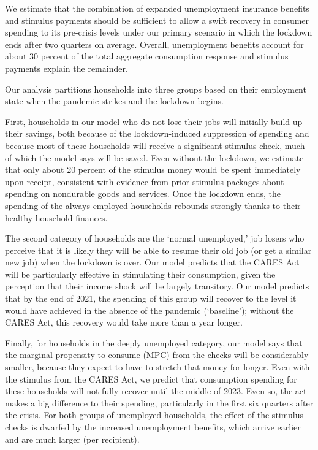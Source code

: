 \documentclass[titlepage]{\econtex}
\begin{document}
We estimate that the combination of expanded unemployment insurance benefits and stimulus payments should be sufficient to allow a swift recovery in consumer spending to its pre-crisis levels under our primary scenario in which the lockdown ends after two quarters on average. 
Overall, unemployment benefits account for about 30 percent of the total aggregate consumption response and stimulus payments explain the remainder.

Our analysis partitions households into three groups based on their employment state when the pandemic strikes and the lockdown begins.

First, households in our model who do not lose their jobs will initially build up their savings, both because of the lockdown-induced suppression of spending and because most of these households will receive a significant stimulus check, much of which the model says will be saved.
Even without the lockdown, we estimate that only about 20 percent of the stimulus money would be spent immediately upon receipt, consistent with evidence from prior stimulus packages about spending on nondurable goods and services.
Once the lockdown ends, the spending of the always-employed households rebounds strongly thanks to their healthy household finances.

The second category of households are the `normal unemployed,' job losers who perceive that it is likely they will be able to resume their old job (or get a similar new job) when the lockdown is over.
Our model predicts that the CARES Act will be particularly effective in stimulating their consumption, given the perception that their income shock will be largely transitory.  Our model predicts that by the end of 2021, the spending of this group will recover to the level it would have achieved in the absence of the pandemic (`baseline'); without the CARES Act, this recovery would take more than a year longer.

Finally, for households in the deeply unemployed category, our model says that the marginal propensity to consume (MPC) from the checks will be considerably smaller, because they expect to have to stretch that money for longer.
Even with the stimulus from the CARES Act, we predict that consumption spending for these households will not fully recover until the middle of 2023.
Even so, the act makes a big difference to their spending, particularly in the first six quarters after the crisis.
For both groups of unemployed households, the effect of the stimulus checks is dwarfed by the increased unemployment benefits, which arrive earlier and are much larger (per recipient).
\end{document}
